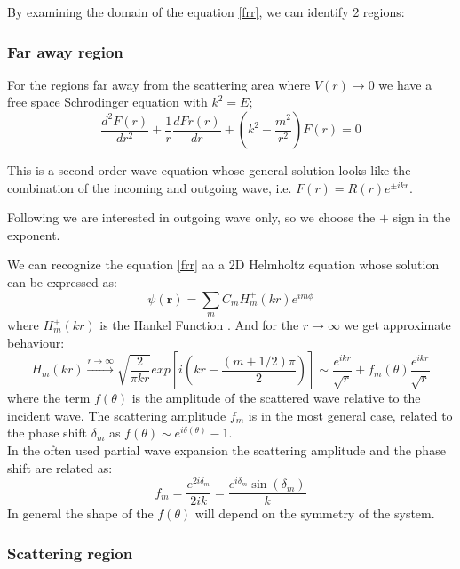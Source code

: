 By examining the domain of the equation \eqref{frr},  we can identify 2 regions:

\subsubsection{\textbf{Far away region}}
 For the regions far away from the scattering area where $ V(r) \rightarrow 0 $ we have a free space Schrodinger equation with $ k^2 = E $;
\begin{equation}\label{2DS1H}
\frac{d^2 F(r)}{dr^2} + \frac{1}{r}\frac{d Fr(r)}{dr} + \left(k^2 - \frac{m^2}{r^2}\right)F(r) = 0
\end{equation}

This is a second order wave equation whose general solution looks like the combination of the incoming and outgoing wave, i.e. $ F(r) = R(r)e^{\pm ikr} $.

Following \cite{2DScatterLessons} we are interested in outgoing wave only, so we choose the $ + $ sign in the exponent.

We can recognize the equation \eqref{frr} aa a 2D Helmholtz equation whose solution can be expressed as:
\begin{equation}\label{2DS2H}
\psi(\mathbf{r}) = \sum_{m}{C_mH_m^+(kr)e^{im\phi}}
\end{equation}
where $ H_m^+(kr) $ is the Hankel Function .
And for the $ r \rightarrow \infty $ we get approximate behaviour:
\begin{equation}\label{2DS2}
    H_m(kr) \xrightarrow{r \rightarrow \infty}\sqrt{\frac{2}{\pi k r}}exp\left[i\left(kr - \frac{(m + 1/2)\pi}{2}\right)\right] \sim \frac{e^{ikr}}{\sqrt{r}} + f_m(\theta) \frac{e^{ikr}}{\sqrt{r}}
\end{equation}
where the term $ f(\theta) $ is the amplitude of the scattered wave relative to the incident wave. 
The scattering amplitude $ f_m $ is in the most general case, related to the phase shift $ \delta_m $ as $ f(\theta) \sim e^{i\delta(\theta)} - 1 $. \\
In the often used partial wave expansion the scattering amplitude and the phase shift are related as:
\begin{equation}
    f_m = \frac{e^{2i \delta_m}}{2ik} = \frac{e^{i\delta_m}\sin(\delta_m)}{k}
\end{equation}
In general the shape of the $ f(\theta) $ will depend on the symmetry of the system.

\subsubsection{\textbf{Scattering region}}

